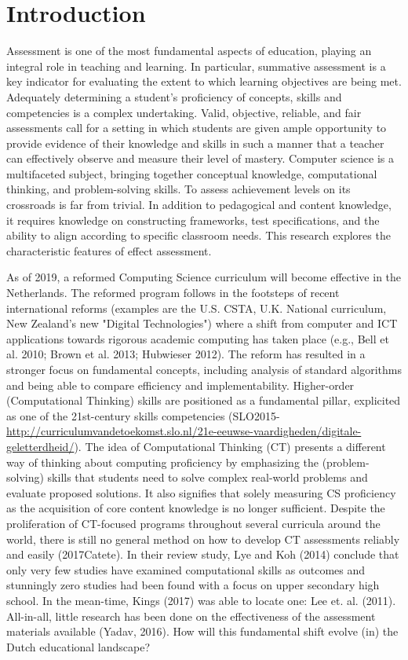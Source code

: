 \section{Introduction}\label{sec:intro}

Assessment is one of the most fundamental aspects of education, playing an integral role in teaching and learning. In particular, summative assessment is a key indicator for evaluating the extent to which learning objectives are being met. Adequately determining a student's proficiency of concepts, skills and competencies is a complex undertaking. Valid, objective, reliable, and fair assessments call for a setting in which students are given ample opportunity to provide evidence of their knowledge and skills in such a manner that a teacher can effectively observe and measure their level of mastery. Computer science is a multifaceted subject, bringing together conceptual knowledge, computational thinking, and problem-solving skills. To assess achievement levels on its crossroads is far from trivial. In addition to pedagogical and content knowledge, it requires knowledge on constructing frameworks, test specifications, and the ability to align according to specific classroom needs. This research explores the characteristic features of effect assessment.

As of 2019, a reformed Computing Science curriculum will become effective in the Netherlands. The reformed program follows in the footsteps of recent international reforms (examples are the U.S. CSTA, U.K. National curriculum, New Zealand's new "Digital Technologies") where a shift from computer and ICT applications towards rigorous academic computing has taken place (e.g., Bell et al. 2010; Brown et al. 2013; Hubwieser 2012). The reform has resulted in a stronger focus on fundamental concepts, including analysis of standard algorithms and being able to compare efficiency and implementability. Higher-order (Computational Thinking) skills are positioned as a fundamental pillar, explicited as one of the 21st-century skills competencies (SLO2015-
\url{http://curriculumvandetoekomst.slo.nl/21e-eeuwse-vaardigheden/digitale-geletterdheid/}). The idea of Computational Thinking (CT) presents a different way of thinking about computing proficiency by emphasizing the (problem-solving) skills that students need to solve complex real-world problems and evaluate proposed solutions. It also signifies that solely measuring CS proficiency as the acquisition of core content knowledge is no longer sufficient. Despite the proliferation of CT-focused programs throughout several curricula around the world, there is still no general method on how to develop CT assessments reliably and easily (2017Catete). In their review study, Lye and Koh (2014) conclude that only very few studies have examined computational skills as outcomes and stunningly zero studies had been found with a focus on upper secondary high school. In the mean-time, Kings (2017) was able to locate one: Lee et. al. (2011). All-in-all, little research has been done on the effectiveness of the assessment materials available (Yadav, 2016).
How will this fundamental shift evolve (in) the Dutch educational landscape?




